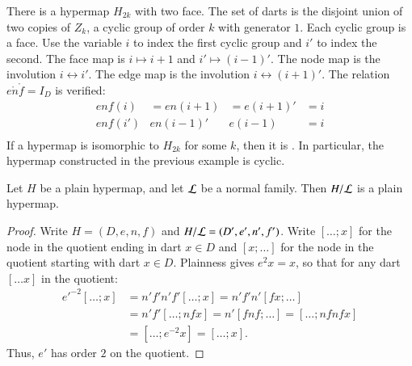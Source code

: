 \begin{example}[cyclic]\label{ex:H2k} 
There is a hypermap $H_{2k}$ with two face.  The set of darts is the
disjoint union of two copies of $Z_k$, a cyclic group of order $k$
with generator $1$.  Each cyclic group is a face.  Use the variable
$i$ to index the first cyclic group and $i'$ to index the second.
The face map is $i\mapsto i+1$ and $i'\mapsto (i-1)'$.  The node map
is the involution $i\leftrightarrow i'$.  The edge map is the
involution $i\leftrightarrow (i+1)'$.  The relation $e\ocirc n\ocirc
f = I_D$ is verified:
\begin{displaymath}
\begin{array}{llllllll}
enf(i) &= e n(i+1) &= e(i+1)' &= i\\
e n f (i') & e n (i-1)' & e (i-1) &= i\\
\end{array}
\end{displaymath}
If a hypermap is isomorphic to $H_{2k}$ for
some $k$, then it is .  In particular,
the hypermap constructed in the previous example is cyclic.
%
%
\end{example}

\begin{lemma}
Let $H$ be a plain hypermap, and let $\cal L$ be a
normal family.  Then $H/{\cal L}$ is a plain hypermap.
\end{lemma}

\begin{proof}  Write $H=(D,e,n,f)$ and $H/{\cal L} = (D',e',n',f')$.  
Write $[\ldots; x]$ for the node in
the quotient ending in dart $x\in D$ and $[x;\ldots]$ for the node
in the quotient starting with dart $x\in D$.  Plainness gives $e^2 x
= x$, so that for any dart $[\ldots x]$ in the quotient:
\begin{displaymath}\begin{array}{lll}
{e'}^{-2} [\ldots; x] &= n' f' n' f' [\ldots; x] = n' f' n' [f x; \ldots] \\&=
n' f' [\ldots; n f x] = n' [f n f; \ldots] = [\ldots; n f n f x]\\ &=
[\ldots; e^{-2} x] = [\ldots; x].
\end{array}\end{displaymath}
Thus, $e'$ has order $2$ on the quotient.
\end{proof}

%


